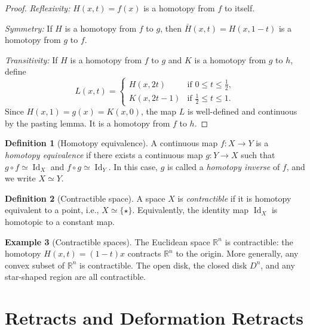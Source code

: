 \documentclass[12pt,a4paper,openany]{book}
\theoremstyle{definition}
\newtheorem{definition}{Definition}[chapter]
\newtheorem{example}[definition]{Example}
\theoremstyle{plain}
\theoremstyle{remark}
\newcommand{\R}{\mathbb{R}}
\DeclareMathOperator{\Id}{Id}
\begin{document}
\begin{proof}
\emph{Reflexivity:} $H(x,t) = f(x)$ is a homotopy from $f$ to itself.

\emph{Symmetry:} If $H$ is a homotopy from $f$ to $g$, then $\bar{H}(x,t) =
H(x, 1-t)$ is a homotopy from $g$ to $f$.

\emph{Transitivity:} If $H$ is a homotopy from $f$ to $g$ and $K$ is a
homotopy from $g$ to $h$, define
\[
  L(x, t) = \begin{cases} H(x, 2t) & \text{if } 0 \le t \le \tfrac{1}{2}, \\
  K(x, 2t - 1) & \text{if } \tfrac{1}{2} \le t \le 1. \end{cases}
\]
Since $H(x,1) = g(x) = K(x,0)$, the map $L$ is well-defined and continuous by
the pasting lemma. It is a homotopy from $f$ to $h$.
\end{proof}

\begin{definition}[Homotopy equivalence]\label{def:homotopy-equivalence}
A continuous map $f \colon X \to Y$ is a \emph{homotopy
equivalence} if there exists a continuous map $g
\colon Y \to X$ such that $g \circ f \simeq \Id_X$ and $f \circ g \simeq
\Id_Y$. In this case, $g$ is called a \emph{homotopy inverse} of $f$, and we
write $X \simeq Y$.
\end{definition}

\begin{definition}[Contractible space]\label{def:contractible}
A space $X$ is \emph{contractible} if it is homotopy
equivalent to a point, i.e., $X \simeq \{\star\}$. Equivalently, the identity
map $\Id_X$ is homotopic to a constant map.
\end{definition}

\begin{example}[Contractible spaces]\label{ex:contractible}
The Euclidean space $\R^n$ is contractible: the homotopy $H(x,t) = (1-t)x$
contracts $\R^n$ to the origin. More generally, any convex subset of $\R^n$ is
contractible. The open disk, the closed disk $D^n$, and any star-shaped region
are all contractible.
\end{example}


\section{Retracts and Deformation Retracts}\label{sec:retracts}
\end{document}
